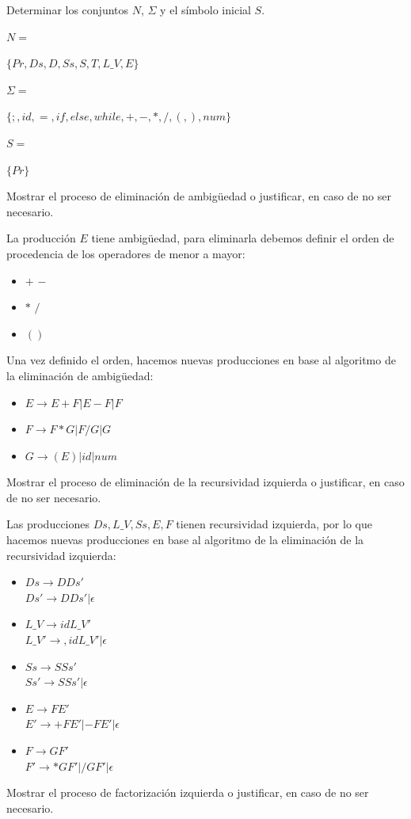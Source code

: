 \documentclass[letterpaper,12pt,titlepage]{article}
\begin{document}
\begin{enumerate}
{\bfseries \item \boldmath Determinar los conjuntos $N$, $\Sigma$ y el símbolo inicial $S$.}
\begin{itemize}
    {\bfseries \item \boldmath $N = $} $\{Pr, Ds, D, Ss, S, T, L\_V, E\}$
    {\bfseries \item \boldmath $\Sigma = $} $\{;, id, =, if, else, while, +, -, *, /, (, ), num\}$
    {\bfseries \item \boldmath $S = $} $\{Pr\}$
\end{itemize}
{\bfseries \item \boldmath Mostrar el proceso de eliminación de ambigüedad o justificar, en caso de no ser necesario.}

La producción $E$ tiene ambigüedad, para eliminarla debemos definir el orden de procedencia de los operadores de menor a mayor:
\begin{itemize}
    \item $+$ $-$
    \item $*$ $/$
    \item $()$
\end{itemize}
Una vez definido el orden, hacemos nuevas producciones en base al algoritmo de la eliminación de ambigüedad:
\begin{itemize}
    \item $E\rightarrow E+F|E-F|F$
    \item $F\rightarrow F*G|F/G|G$
    \item $G\rightarrow (E)|id|num$
\end{itemize}

{\bfseries \item \boldmath 
Mostrar el proceso de eliminación de la recursividad izquierda o justificar, en caso de no ser necesario.}

Las producciones $Ds, L\_V, Ss, E, F$ tienen recursividad izquierda, por lo que hacemos nuevas producciones en base al algoritmo de la eliminación de la recursividad izquierda:
\begin{itemize}
    \item $Ds\rightarrow D Ds'$\\
    $Ds'\rightarrow D Ds'|\epsilon$
    \item $L\_V\rightarrow id L\_V'$\\
    $L\_V'\rightarrow ,id L\_V'|\epsilon$
    \item $Ss\rightarrow S Ss'$\\
    $Ss'\rightarrow S Ss'|\epsilon$
    \item $E\rightarrow F E'$\\
    $E'\rightarrow +F E'|-F E'|\epsilon$
    \item $F\rightarrow GF'$\\
    $F'\rightarrow *G F'|/ G F'|\epsilon$
\end{itemize}
{\bfseries \item \boldmath Mostrar el proceso de factorización izquierda o justificar, en caso de no ser necesario.}


\end{enumerate}
\end{document}
